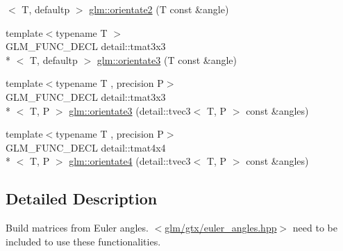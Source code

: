 \begin{DoxyCompactItemize}
$<$ T, defaultp $>$ \hyperlink{group__gtx__euler__angles_gab39476f0decc117783e02ba389a04ee7}{glm\-::orientate2} (T const \&angle)
\item 
{\footnotesize template$<$typename T $>$ }\\G\-L\-M\-\_\-\-F\-U\-N\-C\-\_\-\-D\-E\-C\-L detail\-::tmat3x3\\*
$<$ T, defaultp $>$ \hyperlink{group__gtx__euler__angles_ga2c94907d441c40beb413fe3284c1b267}{glm\-::orientate3} (T const \&angle)
\item 
{\footnotesize template$<$typename T , precision P$>$ }\\G\-L\-M\-\_\-\-F\-U\-N\-C\-\_\-\-D\-E\-C\-L detail\-::tmat3x3\\*
$<$ T, P $>$ \hyperlink{group__gtx__euler__angles_gab6a2a986916647ddedc94bbd2516f20c}{glm\-::orientate3} (detail\-::tvec3$<$ T, P $>$ const \&angles)
\item 
{\footnotesize template$<$typename T , precision P$>$ }\\G\-L\-M\-\_\-\-F\-U\-N\-C\-\_\-\-D\-E\-C\-L detail\-::tmat4x4\\*
$<$ T, P $>$ \hyperlink{group__gtx__euler__angles_ga3b9f62da9726cdad708df41712792082}{glm\-::orientate4} (detail\-::tvec3$<$ T, P $>$ const \&angles)
\end{DoxyCompactItemize}


\subsection{Detailed Description}
Build matrices from Euler angles. $<$\hyperlink{euler__angles_8hpp}{glm/gtx/euler\-\_\-angles.\-hpp}$>$ need to be included to use these functionalities. 

